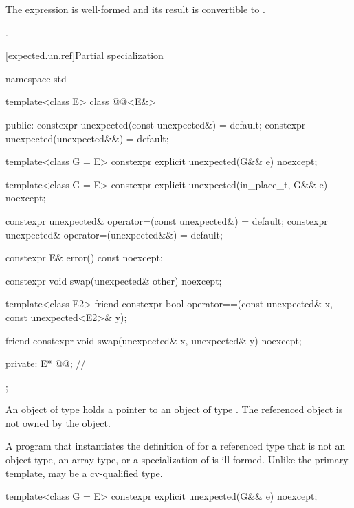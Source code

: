 \begin{itemdescr}
\pnum
\mandates
The expression  is well-formed and its result is convertible to .

\pnum
\returns
{}.
\end{itemdescr}

[expected.un.ref]{Partial specialization }

\begin{codeblock}
namespace std {
  template<class E>
  class @@<E&> {
  public:
    constexpr unexpected(const unexpected&) = default;
    constexpr unexpected(unexpected&&) = default;

    template<class G = E> constexpr explicit unexpected(G&& e) noexcept;

    template<class G = E> constexpr explicit unexpected(in_place_t, G&& e) noexcept;

    constexpr unexpected& operator=(const unexpected&) = default;
    constexpr unexpected& operator=(unexpected&&) = default;

    constexpr E& error() const noexcept;

    constexpr void swap(unexpected& other) noexcept;

    template<class E2>
    friend constexpr bool operator==(const unexpected& x, const unexpected<E2>& y);

    friend constexpr void swap(unexpected& x, unexpected& y) noexcept;

  private:
    E* @@; // \expos
  };
}
\end{codeblock}

\pnum
An object of type  holds a pointer to an object of type . The referenced object is not owned by the  object.

\pnum
A program that instantiates the definition of  for a referenced type that is not an object type, an array type, or a specialization of  is ill-formed. Unlike the primary template,  may be a cv-qualified type.


%
\begin{itemdecl}
template<class G = E>
  constexpr explicit unexpected(G&& e) noexcept;
\end{itemdecl}

